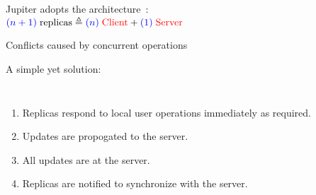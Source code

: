 
\begin{frame}{}
  \centerline{\Huge {}}
\end{frame}

\begin{frame}{}
  \begin{center}
    {\large Jupiter adopts the  architecture~:} \\[3pt] \pause
    {\large $\textcolor{blue}{(n+1)}\; \text{replicas} \triangleq \textcolor{blue}{(n)}\; \text{\textcolor{red}{Client}} + \textcolor{blue}{(1)}\; \text{\textcolor{red}{Server}}$}
  \end{center}

  \begin{center}
    \begin{minipage}{0.50\textwidth}
      
    \end{minipage}
  \end{center}

  \vspace{-1.00cm}
\end{frame}

\begin{frame}{}
  \begin{center}
    {\large {} Conflicts caused by concurrent operations} \\[12pt] \pause
  \end{center}

\end{frame}

\begin{frame}{}
  \begin{center}
    {\large A simple yet  solution:} \pause
  \end{center}

  \begin{columns}
      \begin{enumerate}[(1)]
	\item Replicas respond to local user operations immediately as required.
	\item Updates are propogated to the server.
	\item All updates are  at the server.
	\item Replicas are notified to synchronize with the server.
      \end{enumerate}
  \end{columns}
\end{frame}

